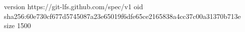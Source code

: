 version https://git-lfs.github.com/spec/v1
oid sha256:60e730cf677d5745087a23e65019f6dfe65ce2165838a4cc37c00a31370b713e
size 1500
